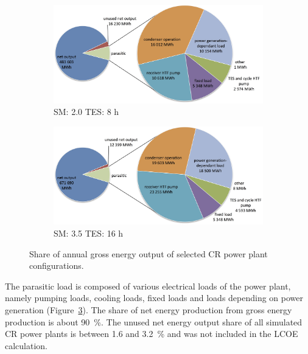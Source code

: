 \begin{figure}[!htbp]
        \centering   
        \begin{subfigure}[b]{0.65\textwidth}
                \centering
                \includegraphics[width=1\textwidth]{FIG/CR_parasitics_low}
                \caption{SM: 2.0 TES: 8 h}\label{CR_parasitics_low}
        \end{subfigure}
        \begin{subfigure}[b]{0.65\textwidth}
                \centering
                \includegraphics[width=1\textwidth]{FIG/CR_parasitics_high}
                \caption{SM: 3.5 TES: 16 h}\label{CR_parasitics_high}
        \end{subfigure}
        \caption[Share of annual gross energy output of selected CR power plant configurations.]{Share of annual gross energy output of selected CR power plant configurations.}\label{CR_parasitics}
\end{figure}
The parasitic load is composed of various electrical loads of the power plant, namely pumping loads, cooling loads, fixed loads and loads depending on power generation (Figure~\ref{CR_parasitics}). The share of net energy production from gross energy production is about \SI{90}{\percent}. The unused net energy output share of all simulated CR power plants is between \num{1.6} and \SI{3.2}{\percent} and was not included in the LCOE calculation.


